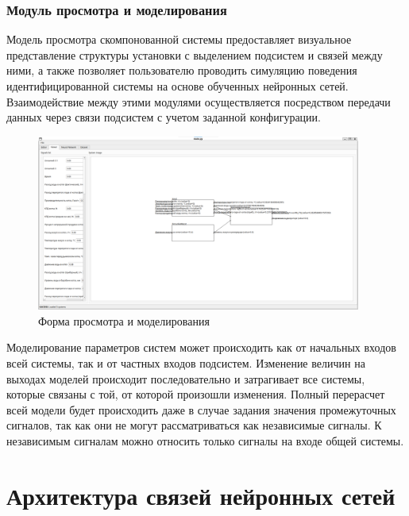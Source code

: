 \subsubsection{Модуль просмотра и моделирования}

Модель просмотра скомпонованной системы предоставляет визуальное представление
структуры установки с выделением подсистем и связей между ними, а также
позволяет пользователю проводить симуляцию поведения идентифицированной системы
на основе обученных нейронных сетей. Взаимодействие между этими модулями
осуществляется посредством передачи данных через связи подсистем с учетом
заданной конфигурации.

\begin{figure}[H]
  \begin{center}
    \includegraphics[width=0.95\textwidth]{figures/modules/modelling.png}
  \end{center}
  \caption{Форма просмотра и моделирования}\label{fig:forms:viewer}
\end{figure}

Моделирование параметров систем может происходить как от начальных входов всей
системы, так и от частных входов подсистем. Изменение величин на выходах моделей
происходит последовательно и затрагивает все системы, которые связаны с той, от
которой произошли изменения. Полный перерасчет всей модели будет происходить
даже в случае задания значения промежуточных сигналов, так как они не могут
рассматриваться как независимые сигналы. К независимым сигналам можно относить
только сигналы на входе общей системы.

\section{Архитектура связей нейронных сетей}

